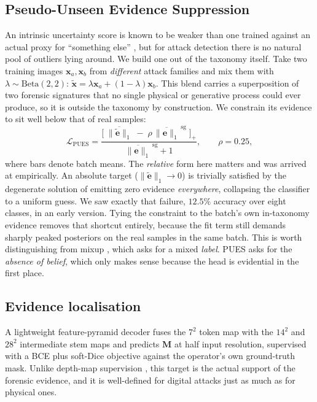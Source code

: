 \documentclass[conference]{IEEEtran}
\newcommand{\bs}[1]{\boldsymbol{#1}}
\begin{document}
\subsection{Pseudo-Unseen Evidence Suppression}
An intrinsic uncertainty score is known to be weaker than one trained against an
actual proxy for ``something else'' \cite{hendrycks2019oe}, but for attack detection
there is no natural pool of outliers lying around. We build one out of the taxonomy
itself. Take two training images $\bs{x}_{a},\bs{x}_{b}$ from \emph{different}
attack families and mix them with $\lambda\sim\mathrm{Beta}(2,2)$:
$\tilde{\bs{x}}=\lambda\bs{x}_{a}+(1-\lambda)\bs{x}_{b}$. This blend carries a
superposition of two forensic signatures that no single physical or generative
process could ever produce, so it is outside the taxonomy by construction. We
constrain its evidence to sit well below that of real samples:
\begin{equation}
\mathcal{L}_{\text{PUES}} =
\frac{\bigl[\;\overline{\lVert\tilde{\bs{e}}\rVert_{1}}
      \;-\;\rho\,\overline{\lVert\bs{e}\rVert_{1}}^{\,\text{sg}}\;\bigr]_{+}}
     {\overline{\lVert\bs{e}\rVert_{1}}^{\,\text{sg}}+1},
\qquad \rho = 0.25,
\end{equation}
where bars denote batch means. The \emph{relative} form here matters and was arrived
at empirically. An absolute target ($\lVert\tilde{\bs{e}}\rVert_{1}\to0$) is
trivially satisfied by the degenerate solution of emitting zero evidence
\emph{everywhere}, collapsing the classifier to a uniform guess. We saw exactly that
failure, $12.5\%$ accuracy over eight classes, in an early version. Tying the
constraint to the batch's own in-taxonomy evidence removes that shortcut entirely,
because the fit term still demands sharply peaked posteriors on the real samples in
the same batch. This is worth distinguishing from mixup \cite{zhang2018mixup}, which
asks for a mixed \emph{label}. PUES asks for the \emph{absence of belief}, which
only makes sense because the head is evidential in the first place.

\subsection{Evidence localisation}
A lightweight feature-pyramid decoder fuses the $7^{2}$ token map with the $14^{2}$
and $28^{2}$ intermediate stem maps and predicts $\bs{M}$ at half input resolution,
supervised with a BCE plus soft-Dice objective against the operator's own
ground-truth mask. Unlike depth-map supervision
\cite{liu2018auxiliary,yu2021revisiting}, this target is the actual support of the
forensic evidence, and it is well-defined for digital attacks just as much as for
physical ones.
\end{document}
